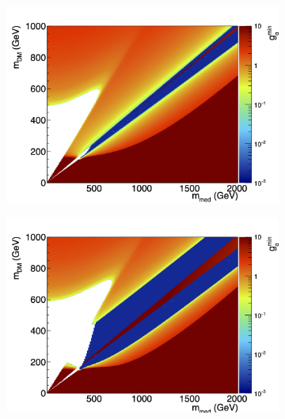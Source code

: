 \documentclass[a4paper, 11pt]{article}
\begin{document}
\begin{figure}[htp!]
  \begin{center}
  \begin{subfigure}[b]{0.49\textwidth}  
    \includegraphics[width=\textwidth]{figures/coupling/s_gqmin.png}
    \caption{}
    \label{subfig:scalar}
  \end{subfigure}
  \begin{subfigure}[b]{0.49\textwidth}  
    \includegraphics[width=\textwidth]{figures/coupling/p_gqmin.png}
    \caption{}
    \label{subfig:pseudoscalar}  
  \end{subfigure}
   \begin{subfigure}[b]{0.49\textwidth}  

\end{subfigure}
\end{center}
\end{figure}
\end{document}
